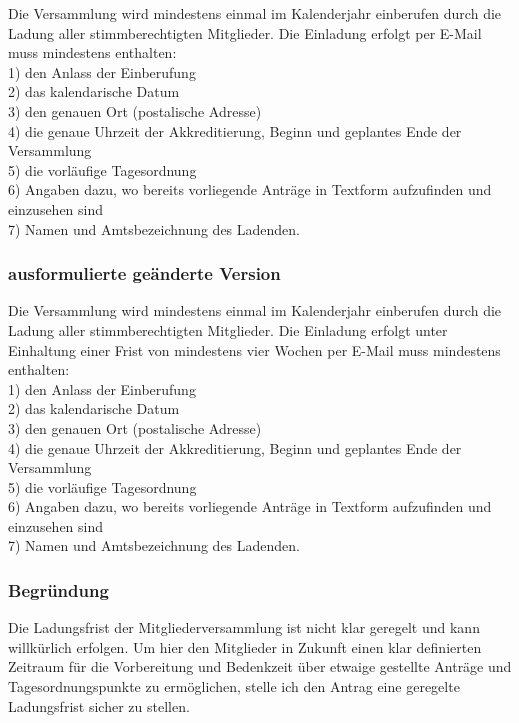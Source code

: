 \documentclass[a4paper]{scrartcl}
\begin{document}
Die Versammlung wird mindestens einmal im Kalenderjahr einberufen durch die Ladung aller stimmberechtigten Mitglieder. Die Einladung erfolgt per E-Mail
muss mindestens enthalten:\\
1) den Anlass der Einberufung\\
2) das kalendarische Datum\\
3) den genauen Ort (postalische Adresse)\\
4) die genaue Uhrzeit der Akkreditierung, Beginn und geplantes Ende der Versammlung\\
5) die vorläufige Tagesordnung\\
6) Angaben dazu, wo bereits vorliegende Anträge in Textform aufzufinden und einzusehen sind\\
7) Namen und Amtsbezeichnung des Ladenden.\\

\subsubsection{ausformulierte geänderte Version}

Die Versammlung wird mindestens einmal im Kalenderjahr einberufen durch die Ladung aller stimmberechtigten Mitglieder. Die Einladung erfolgt unter Einhaltung einer Frist von mindestens vier Wochen per E-Mail muss mindestens enthalten:\\
1) den Anlass der Einberufung\\
2) das kalendarische Datum\\
3) den genauen Ort (postalische Adresse)\\
4) die genaue Uhrzeit der Akkreditierung, Beginn und geplantes Ende der Versammlung\\
5) die vorläufige Tagesordnung\\
6) Angaben dazu, wo bereits vorliegende Anträge in Textform aufzufinden und einzusehen sind\\
7) Namen und Amtsbezeichnung des Ladenden.\\

\subsubsection{Begründung}

Die Ladungsfrist der Mitgliederversammlung ist nicht klar geregelt und kann willkürlich erfolgen. Um hier den Mitglieder in Zukunft einen klar definierten Zeitraum für die Vorbereitung und Bedenkzeit über etwaige gestellte Anträge und Tagesordnungspunkte zu ermöglichen, stelle ich den Antrag eine geregelte Ladungsfrist sicher zu stellen.
\end{document}
